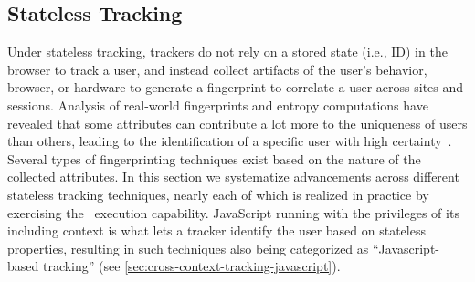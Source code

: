 









\subsection{Stateless Tracking}
\label{sec:stateless-tracking}

Under stateless tracking, trackers do not rely on a stored state (i.e., ID) in the browser to track a user, and instead collect artifacts of the user's behavior, browser, or hardware to generate a fingerprint to correlate a user across sites and sessions.
%
Analysis of real-world fingerprints and entropy computations have revealed that some attributes can contribute a lot more to the uniqueness of users than others, leading to the identification of a specific user with high certainty~\cite{eckersleyHowUniqueYour2010,laperdrixBeautyBeastDiverting2016,gomez-boixHidingCrowdAnalysis2018,bacis2024assessing}.
%
Several types of fingerprinting techniques exist based on the nature of the collected attributes.
%
In this section we systematize advancements across different stateless tracking techniques, nearly each of which is realized in practice by exercising the \symExecution\ execution capability. 
%
JavaScript running with the privileges of its including context is what lets a tracker identify the user based on stateless properties, resulting in such techniques also being categorized as ``Javascript-based tracking'' (see \autoref{sec:cross-context-tracking-javascript}).


